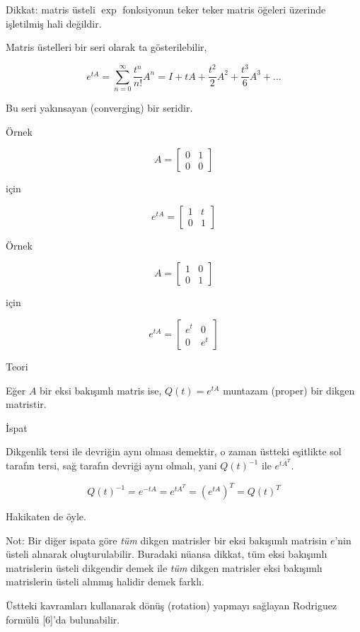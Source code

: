 \documentclass[12pt,fleqn]{article}\usepackage{../../common}
\begin{document}
Dikkat: matris üsteli $\exp$ fonksiyonun teker teker matris öğeleri
üzerinde işletilmiş hali değildir.

Matris üstelleri bir seri olarak ta gösterilebilir, 

$$ e^{tA} = \sum_{n=0}^{\infty} \frac{t^n}{n!} A^n = 
I + tA + \frac{t^2}{2}A^2 + \frac{t^3}{6}A^3 + ...
$$

Bu seri yakınsayan (converging) bir seridir. 

Örnek

$$ A = \left[\begin{array}{rrr}
0 & 1 \\ 0 & 0
\end{array}\right] $$

için 

$$ e^{tA} = \left[\begin{array}{rrr}
1 & t \\ 0 & 1
\end{array}\right] $$

Örnek

$$ A = \left[\begin{array}{rrr}
1 & 0 \\ 0 & 1
\end{array}\right] $$

için 

$$ e^{tA} = \left[\begin{array}{rrr}
e^t & 0 \\ 0 & e^t
\end{array}\right] $$

Teori 

Eğer $A$ bir eksi bakışımlı matris ise, $Q(t) = e^{tA}$ muntazam 
(proper) bir dikgen matristir. 

İspat 

Dikgenlik tersi ile devriğin aynı olması demektir, o zaman üstteki
eşitlikte sol tarafın tersi, sağ tarafın devriği aynı olmalı, yani
$Q(t)^{-1}$ ile $e^{tA^T}$.

$$ Q(t)^{-1} = e^{-tA} = e^{tA^T} = (e^{tA})^T = Q(t)^T $$

Hakikaten de öyle. 

Not: Bir diğer ispata göre {\em tüm} dikgen matrisler bir eksi bakışımlı
matrisin $e$'nin üsteli alınarak oluşturulabilir. Buradaki nüansa dikkat,
tüm eksi bakışımlı matrislerin üsteli dikgendir demek ile {\em tüm} dikgen
matrisler eksi bakışımlı matrislerin üsteli alınmış halidir demek farklı.

Üstteki kavramları kullanarak dönüş (rotation) yapmayı sağlayan Rodriguez
formülü [6]'da bulunabilir.
\end{document}
